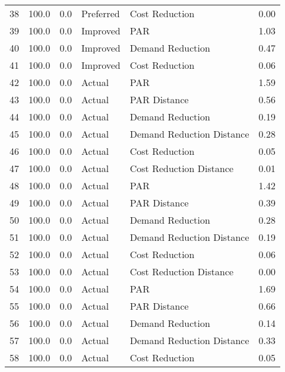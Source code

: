 \begin{longtable}{lrrllr}
38   &        100.0 &     0.0 &      Preferred &             Cost Reduction &   0.00 \\
39   &        100.0 &     0.0 &       Improved &                        PAR &   1.03 \\
40   &        100.0 &     0.0 &       Improved &           Demand Reduction &   0.47 \\
41   &        100.0 &     0.0 &       Improved &             Cost Reduction &   0.06 \\
42   &        100.0 &     0.0 &         Actual &                        PAR &   1.59 \\
43   &        100.0 &     0.0 &         Actual &               PAR Distance &   0.56 \\
44   &        100.0 &     0.0 &         Actual &           Demand Reduction &   0.19 \\
45   &        100.0 &     0.0 &         Actual &  Demand Reduction Distance &   0.28 \\
46   &        100.0 &     0.0 &         Actual &             Cost Reduction &   0.05 \\
47   &        100.0 &     0.0 &         Actual &    Cost Reduction Distance &   0.01 \\
48   &        100.0 &     0.0 &         Actual &                        PAR &   1.42 \\
49   &        100.0 &     0.0 &         Actual &               PAR Distance &   0.39 \\
50   &        100.0 &     0.0 &         Actual &           Demand Reduction &   0.28 \\
51   &        100.0 &     0.0 &         Actual &  Demand Reduction Distance &   0.19 \\
52   &        100.0 &     0.0 &         Actual &             Cost Reduction &   0.06 \\
53   &        100.0 &     0.0 &         Actual &    Cost Reduction Distance &   0.00 \\
54   &        100.0 &     0.0 &         Actual &                        PAR &   1.69 \\
55   &        100.0 &     0.0 &         Actual &               PAR Distance &   0.66 \\
56   &        100.0 &     0.0 &         Actual &           Demand Reduction &   0.14 \\
57   &        100.0 &     0.0 &         Actual &  Demand Reduction Distance &   0.33 \\
58   &        100.0 &     0.0 &         Actual &             Cost Reduction &   0.05 \\

\end{longtable}

